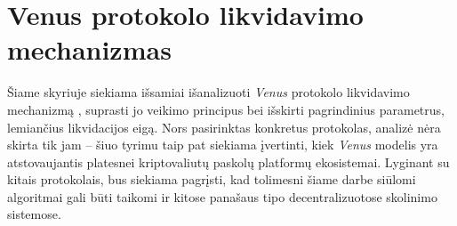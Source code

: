 \documentclass[]{VUMIFTemplateClass}
\begin{document}
\section{Venus protokolo likvidavimo mechanizmas}
\label{sec:venus_mechanizmas}

Šiame skyriuje siekiama išsamiai išanalizuoti \textit{Venus} protokolo likvidavimo mechanizmą \cite{venusprotocolcode}, suprasti jo veikimo principus bei išskirti pagrindinius parametrus, lemiančius likvidacijos eigą. Nors pasirinktas konkretus protokolas, analizė nėra skirta tik jam – šiuo tyrimu taip pat siekiama įvertinti, kiek \textit{Venus} modelis yra atstovaujantis platesnei kriptovaliutų paskolų platformų ekosistemai. Lyginant su kitais protokolais, bus siekiama pagrįsti, kad tolimesni šiame darbe siūlomi algoritmai gali būti taikomi ir kitose panašaus tipo decentralizuotose skolinimo sistemose.
\end{document}
